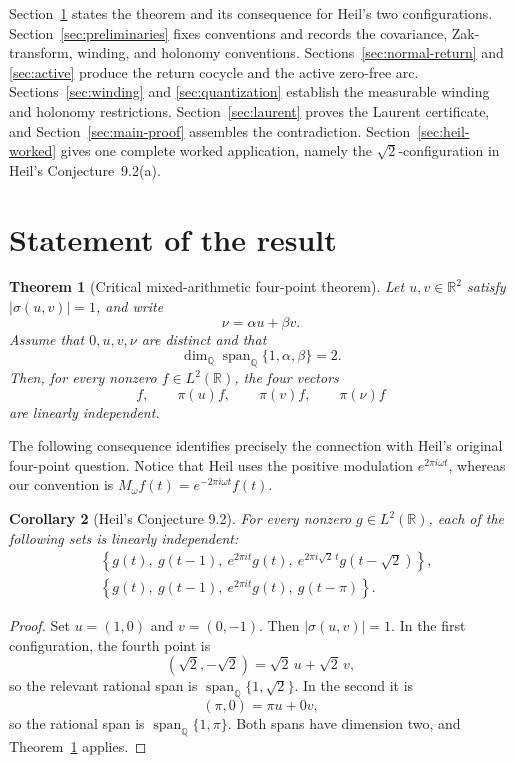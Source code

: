 \documentclass[reqno]{amsart}
\newtheorem{theorem}{Theorem}[section]
\newtheorem{corollary}[theorem]{Corollary}
\theoremstyle{remark}
\numberwithin{equation}{section}
\newcommand{\R}{\mathbb{R}}
\newcommand{\Q}{\mathbb{Q}}
\begin{document}
Section~\ref{sec:statement} states the theorem and its consequence for Heil's
two configurations. Section~\ref{sec:preliminaries} fixes conventions and
records the covariance, Zak-transform, winding, and holonomy conventions.
Sections~\ref{sec:normal-return} and \ref{sec:active} produce the return
cocycle and the active zero-free arc.
Sections~\ref{sec:winding} and \ref{sec:quantization} establish the measurable
winding and holonomy restrictions. Section~\ref{sec:laurent} proves the
Laurent certificate, and Section~\ref{sec:main-proof} assembles the
contradiction. Section~\ref{sec:heil-worked} gives one complete worked
application, namely the \(\sqrt2\)-configuration in Heil's
Conjecture~9.2(a).

\section{Statement of the result}
\label{sec:statement}

\begin{theorem}[Critical mixed-arithmetic four-point theorem]
\label{thm:main}
Let \(u,v\in\R^2\) satisfy \(\lvert\sigma(u,v)\rvert=1\), and write
\[
  \nu=\alpha u+\beta v.
\]
Assume that \(0,u,v,\nu\) are distinct and that
\[
  \dim_{\Q}\operatorname{span}_{\Q}\{1,\alpha,\beta\}=2.
\]
Then, for every nonzero \(f\in L^2(\R)\), the four vectors
\[
  f,\qquad \pi(u)f,\qquad \pi(v)f,\qquad \pi(\nu)f
\]
are linearly independent.
\end{theorem}

The following consequence identifies precisely the connection with Heil's
original four-point question. Notice that Heil uses the positive modulation
\(e^{2\pi i\omega t}\), whereas our convention is
\(M_\omega f(t)=e^{-2\pi i\omega t}f(t)\).

\begin{corollary}[Heil's Conjecture 9.2]
\label{cor:heil}
For every nonzero \(g\in L^2(\R)\), each of the following sets is linearly
independent:
\begin{align*}
  &\left\{
    g(t),\ g(t-1),\ e^{2\pi it}g(t),\
    e^{2\pi i\sqrt2\,t}g(t-\sqrt2)
  \right\},\\
  &\left\{
    g(t),\ g(t-1),\ e^{2\pi it}g(t),\ g(t-\pi)
  \right\}.
\end{align*}
\end{corollary}

\begin{proof}
Set \(u=(1,0)\) and \(v=(0,-1)\). Then
\(|\sigma(u,v)|=1\). In the first configuration, the fourth point is
\[
  (\sqrt2,-\sqrt2)=\sqrt2\,u+\sqrt2\,v,
\]
so the relevant rational span is \(\operatorname{span}_{\Q}\{1,\sqrt2\}\).
In the second it is
\[
  (\pi,0)=\pi u+0v,
\]
so the rational span is \(\operatorname{span}_{\Q}\{1,\pi\}\). Both spans
have dimension two, and Theorem~\ref{thm:main} applies.
\end{proof}
\end{document}
